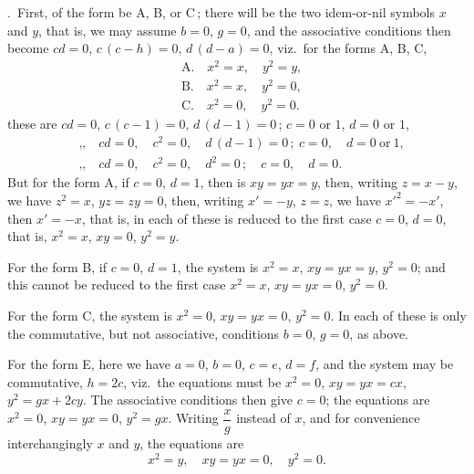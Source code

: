 \documentclass[11pt,a4paper]{article}
\providecommand{\textsc}[1]{{\scshape #1}}
\begin{document}
\fancyhead[C]{\small\textsc{on double algebra.}}
\fancyhead[R]{\small [814}

\thispagestyle{plain}
.\ First, of the form be A, B, or C\,; there will be the two idem-or-nil symbols $x$ and $y$, that is, we may assume $b = 0$, $g = 0$, and the associative conditions then become $cd = 0$, $c\,(c - h) = 0$, $d\,(d - a) = 0$, viz.\ for the forms A, B, C,
\[
\begin{aligned}
&\textrm{A.}\quad x^{2} = x,\quad y^{2} = y,\\
&\textrm{B.}\quad x^{2} = x,\quad y^{2} = 0,\\
&\textrm{C.}\quad x^{2} = 0,\quad y^{2} = 0.
\end{aligned}
\]
these are $cd = 0$, $c\,(c - 1) = 0$, $d\,(d - 1) = 0$\,; $c = 0$ or $1$, $d = 0$ or $1$,
\[
\begin{aligned}
&\textrm{,,}\quad cd = 0,\quad c^{2} = 0,\quad d\,(d - 1) = 0\,;\ c = 0,\quad d = 0\ \text{or}\ 1,\\
&\textrm{,,}\quad cd = 0,\quad c^{2} = 0,\quad d^{2} = 0\,;\quad c = 0,\quad d = 0.
\end{aligned}
\]
But for the form A, if $c = 0$, $d = 1$, then is $xy = yx = y$, then, writing $z = x - y$, we have $z^{2} = x$, $yz = zy = 0$, then, writing $x' = -y$, $z = z$, we have $x'^{2} = -x'$, then $x' = -x$, that is, in each of these is reduced to the first case $c = 0$, $d = 0$, that is, $x^{2} = x$, $xy = 0$, $y^{2} = y$.

\medskip
For the form B, if $c = 0$, $d = 1$, the system is $x^{2} = x$, $xy = yx = y$, $y^{2} = 0$; and this cannot be reduced to the first case $x^{2} = x$, $xy = yx = 0$, $y^{2} = 0$.

\medskip
For the form C, the system is $x^{2} = 0$, $xy = yx = 0$, $y^{2} = 0$.  In each of these is only the commutative, but not associative, conditions $b = 0$, $g = 0$, as above.

\medskip
For the form E, here we have $a = 0$, $b = 0$, $c = e$, $d = f$, and the system may be commutative, $h = 2c$, viz.\ the equations must be $x^{2} = 0$, $xy = yx = cx$, $y^{2} = gx + 2cy$.  The associative conditions then give $c = 0$; the equations are $x^{2} = 0$, $xy = yx = 0$, $y^{2} = gx$.  Writing $\dfrac{x}{g}$ instead of $x$, and for convenience interchangingly $x$ and $y$, the equations are
\[
x^{2} = y,\quad xy = yx = 0,\quad y^{2} = 0.
\]
\end{document}
